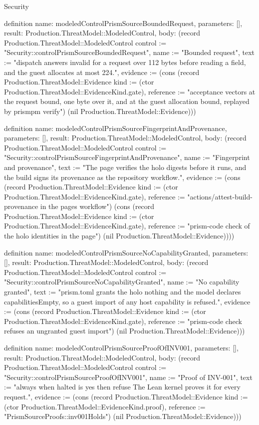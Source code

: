 \begin{lexlean}{Security}
\begin{semanticmodule}
definition{
  name: modeledControlPrismSourceBoundedRequest,
  parameters: [],
  result: Production.ThreatModel::ModeledControl,
  body: (record Production.ThreatModel::ModeledControl {control := "Security::controlPrismSourceBoundedRequest", name := "Bounded request", text := "dispatch answers invalid for a request over 112 bytes before reading a field, and the guest allocates at most 224.", evidence := (cons (record Production.ThreatModel::Evidence {kind := (ctor Production.ThreatModel::EvidenceKind.gate), reference := "acceptance vectors at the request bound, one byte over it, and at the guest allocation bound, replayed by prismpm verify"}) (nil Production.ThreatModel::Evidence))})
}

definition{
  name: modeledControlPrismSourceFingerprintAndProvenance,
  parameters: [],
  result: Production.ThreatModel::ModeledControl,
  body: (record Production.ThreatModel::ModeledControl {control := "Security::controlPrismSourceFingerprintAndProvenance", name := "Fingerprint and provenance", text := "The page verifies the holo digests before it runs, and the build signs its provenance as the repository workflow.", evidence := (cons (record Production.ThreatModel::Evidence {kind := (ctor Production.ThreatModel::EvidenceKind.gate), reference := "actions/attest-build-provenance in the pages workflow"}) (cons (record Production.ThreatModel::Evidence {kind := (ctor Production.ThreatModel::EvidenceKind.gate), reference := "prism-code check of the holo identities in the page"}) (nil Production.ThreatModel::Evidence)))})
}

definition{
  name: modeledControlPrismSourceNoCapabilityGranted,
  parameters: [],
  result: Production.ThreatModel::ModeledControl,
  body: (record Production.ThreatModel::ModeledControl {control := "Security::controlPrismSourceNoCapabilityGranted", name := "No capability granted", text := "prism.toml grants the holo nothing and the model declares capabilitiesEmpty, so a guest import of any host capability is refused.", evidence := (cons (record Production.ThreatModel::Evidence {kind := (ctor Production.ThreatModel::EvidenceKind.gate), reference := "prism-code check refuses an ungranted guest import"}) (nil Production.ThreatModel::Evidence))})
}

definition{
  name: modeledControlPrismSourceProofOfINV001,
  parameters: [],
  result: Production.ThreatModel::ModeledControl,
  body: (record Production.ThreatModel::ModeledControl {control := "Security::controlPrismSourceProofOfINV001", name := "Proof of INV-001", text := "always when halted is yes then refuse The Lean kernel proves it for every request.", evidence := (cons (record Production.ThreatModel::Evidence {kind := (ctor Production.ThreatModel::EvidenceKind.proof), reference := "PrismSourceProofs::inv001Holds"}) (nil Production.ThreatModel::Evidence))})
}


\end{semanticmodule}
\end{lexlean}
